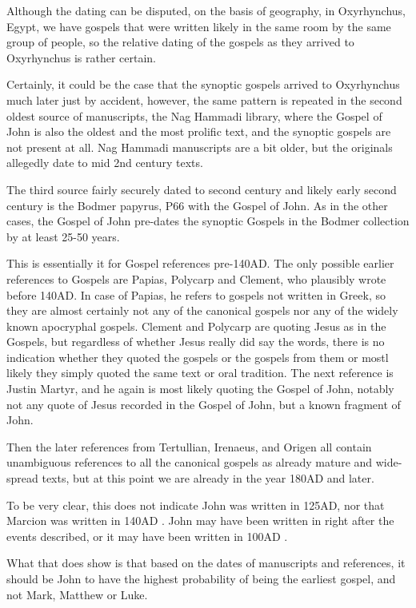 Although the dating can be disputed, on the basis of geography, in Oxyrhynchus, Egypt, we have gospels that were written likely in the same room by the same group of people, so the relative dating of the gospels as they arrived to Oxyrhynchus is rather certain.

Certainly, it could be the case that the synoptic gospels arrived to Oxyrhynchus much later just by accident, however, the same pattern is repeated in the second oldest source of manuscripts, the Nag Hammadi library, where the Gospel of John is also the oldest and the most prolific text, and the synoptic gospels are not present at all.
Nag Hammadi manuscripts are a bit older, but the originals allegedly date to mid 2nd century texts.

The third source fairly securely dated to second century and likely early second century is the Bodmer papyrus, P66 with the Gospel of John.
As in the other cases, the Gospel of John pre-dates the synoptic Gospels in the Bodmer collection by at least 25-50 years.

This is essentially it for Gospel references pre-140AD.
The only possible earlier references to Gospels are Papias, Polycarp and Clement, who plausibly wrote before 140AD.
In case of Papias, he refers to gospels not written in Greek, so they are almost certainly not any of the canonical gospels nor any of the widely known apocryphal gospels.
Clement and Polycarp are quoting Jesus as in the Gospels, but regardless of whether Jesus really did say the words, there is no indication whether they quoted the gospels or the gospels from them or mostl likely they simply quoted the same text or oral tradition.
The next reference is Justin Martyr, and he again is most likely quoting the Gospel of John, notably not any quote of Jesus recorded in the Gospel of John, but a known fragment of John.

Then the later references from Tertullian, Irenaeus, and Origen all contain unambiguous references to all the canonical gospels as already mature and wide-spread texts, but at this point we are already in the year 180AD and later.

To be very clear, this does not indicate John was written in 125AD, nor that Marcion was written in 140AD .
John may have been written in right after the events described, or it may have been written in 100AD .

What that does show is that based on the dates of manuscripts and references, it should be John to have the highest probability of being the earliest gospel, and not Mark, Matthew or Luke.

